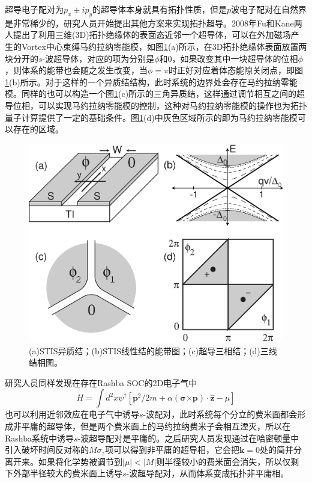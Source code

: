  超导电子配对为$p_x\pm ip_y$的超导体本身就具有拓扑性质，但是$p$波电子配对在自然界是非常稀少的，研究人员开始提出其他方案来实现拓扑超导。2008年Fu和Kane两人提出了利用三维(3D)拓扑绝缘体的表面态近邻一个超导体，可以在外加磁场产生的Vortex中心束缚马约拉纳零能模\cite{re19}，如图\ref{fig5}(a)所示，在3D拓扑绝缘体表面放置两块分开的$s$-波超导体，对应的项为分别是$\phi$和0，如果改变其中一块超导体的位相$\phi$，则体系的能带也会随之发生改变，当$\phi=\pi$时正好对应着体态能隙关闭点，即图\ref{fig5}(b)所示。对于这样的一个异质结结构，此时系统的边界处会存在马约拉纳零能模。同样的也可以构造一个图\ref{fig5}(c)所示的三角异质结，这样通过调节相互之间的超导位相，可以实现马约拉纳零能模的控制，这种对马约拉纳零能模的操作也为拓扑量子计算提供了一定的基础条件。图\ref{fig5}(d)中灰色区域所示的即为马约拉纳零能模可以存在的区域。
\begin{figure}[h]
\centering
\includegraphics[scale=0.5]{pic/fig5}
\caption{(a)STIS异质结；(b)STIS线性结的能带图；(c)超导三相结；(d)三线结相图\cite{re19}。}\label{fig5}
\end{figure}

研究人员同样发现在存在Rashba SOC的2D电子气中
\begin{equation}
H=\int d^2x\psi^\dagger\left[\mathbf{p}^2/2m+\alpha(\mathbf{\sigma}\mathbf{\times p})\cdot\hat{\mathbf{z}}-\mu\right]
\end{equation}
也可以利用近邻效应在电子气中诱导$s$-波配对，此时系统每个分立的费米面都会形成非平庸的超导体，但是两个费米面上的马约拉纳费米子会相互湮灭，所以在Rashba系统中诱导$s$-波超导配对是平庸的。之后研究人员发现通过在哈密顿量中引入破坏时间反对称的$M\sigma_z$项可以得到非平庸的超导相，它会把$\mathbf{k}=0$处的简并分离开来。如果将化学势被调节到$|\mu|<|M|$则半径较小的费米面会消失，所以仅剩下外部半径较大的费米面上诱导$s$-波超导配对，从而体系变成拓扑非平庸相\cite{re20,re21,re22}。

